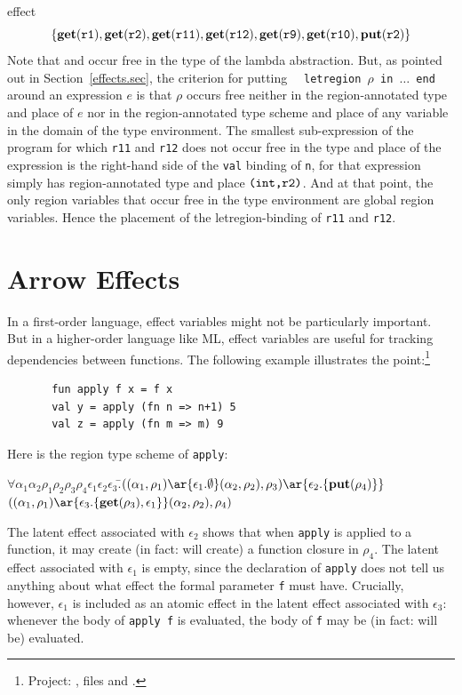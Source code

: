 \documentclass[12pt]{book}
\begin{document}
effect
$$\{\mathop{\bf get}\nolimits(\hbox{\tt r1}), \mathop{\bf get}\nolimits(\hbox{\tt r2}), \mathop{\bf get}\nolimits(\hbox{\tt r11}), 
    \mathop{\bf get}\nolimits(\hbox{\tt r12}), \mathop{\bf get}\nolimits(\hbox{\tt r9}),
    \mathop{\bf get}\nolimits(\hbox{\tt r10}), \mathop{\bf put}\nolimits(\hbox{\tt r2})\}$$
Note that  and  occur free in the type of the
lambda abstraction. But, as pointed out in Section~\ref{effects.sec},
the criterion
for putting ~~{\tt letregion $\rho$ in $\ldots$ end}~~ around an expression $e$
is that $\rho$ occurs free neither in the region-annotated type and place of $e$ nor
in the region-annotated type scheme and place of any variable in the domain of the
type environment. The smallest sub-expression
of the program for which {\tt r11} and {\tt r12} does not occur free in
the type and place of the expression is the right-hand side 
of the {\tt val} binding of {\tt n}, for that expression
simply has region-annotated type and place $\hbox{\tt (int,r2)}$.
And at that point, the only region variables that occur free in
the type environment are global region variables.
Hence the placement of the letregion-binding of {\tt r11} and
{\tt r12}.

\section{Arrow Effects}
In a first-order language, effect variables might not be particularly important.
But in a higher-order language like ML, effect variables are useful for tracking
dependencies between functions. The following example illustrates the point:\footnote{Project: , files
 and .}
\begin{verbatim}
       fun apply f x = f x
       val y = apply (fn n => n+1) 5
       val z = apply (fn m => m) 9
\end{verbatim}
Here is the region type scheme of {\tt apply}:
\begin{tabbing}
\qquad$\forall\alpha_1\alpha_2\rho_1\rho_2\rho_3\rho_4\epsilon_1\epsilon_2\epsilon_3.$\=$((\alpha_1,\rho_1)
        \ar{\epsilon_1.\emptyset}(\alpha_2,\rho_2),\rho_3)\ar{\epsilon_2.\{\Put(\rho_4)\}}$\\
            \>$((\alpha_1,\rho_1)\ar{\epsilon_3.\{\Get(\rho_3), \epsilon_1\}}(\alpha_2,\rho_2),\rho_4)$
\end{tabbing}
The latent effect associated with $\epsilon_2$ shows that when {\tt apply} is applied to a function,
it may create (in fact: will create) a function closure in $\rho_4$.  The latent effect associated with
$\epsilon_1$ is empty, since the declaration of {\tt apply} does not tell us anything about what effect
the formal parameter {\tt f} must have. Crucially,  however, $\epsilon_1$ is included as an atomic effect
in the latent effect associated with $\epsilon_3$: whenever the body of {\tt apply f} is evaluated, the
body of {\tt f} may be (in fact: will be) evaluated.
\end{document}
